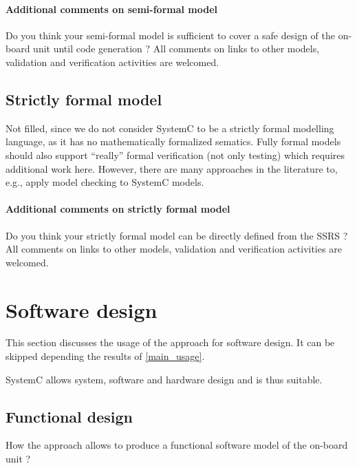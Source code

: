 \paragraph{Additional comments on semi-formal model} Do you think your semi-formal model is sufficient to cover a safe design of the on-board unit until code generation ?
All comments on links to other models, validation and verification activities are welcomed.

\subsection{Strictly formal model}

\begin{author_comment}
Not filled, since we do not consider SystemC to be a strictly formal modelling language, as it has no mathematically formalized sematics. Fully formal models should also support ``really'' formal verification (not only testing) which requires additional work here. However, there are many approaches in the literature to, e.g., apply model checking to SystemC models.
\end{author_comment}


\paragraph{Additional comments on strictly formal model} Do you think your strictly formal model can be directly defined from the SSRS ?
All comments on links to other models, validation and verification activities are welcomed.


\section{Software design}
This section discusses the usage of the approach for software design.
It can be skipped depending the results of \ref{main_usage}.

\begin{author_comment}
SystemC allows system, software and hardware design and is thus suitable.
\end{author_comment}

\subsection{Functional design}

How the approach allows to produce a functional software model of the on-board unit ?

